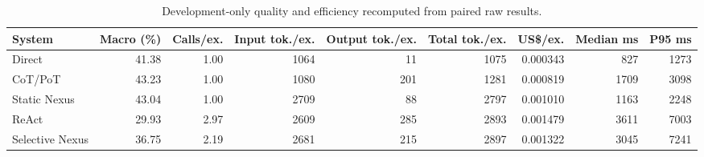 \begin{table}[t]
\centering
\small
\begin{tabular}{lrrrrrrrr}
\toprule
System & Macro (\%) & Calls/ex. & Input tok./ex. & Output tok./ex. & Total tok./ex. & US\$/ex. & Median ms & P95 ms \\
\midrule
Direct & 41.38 & 1.00 & 1064 & 11 & 1075 & 0.000343 & 827 & 1273 \\
CoT/PoT & 43.23 & 1.00 & 1080 & 201 & 1281 & 0.000819 & 1709 & 3098 \\
Static Nexus & 43.04 & 1.00 & 2709 & 88 & 2797 & 0.001010 & 1163 & 2248 \\
ReAct & 29.93 & 2.97 & 2609 & 285 & 2893 & 0.001479 & 3611 & 7003 \\
Selective Nexus & 36.75 & 2.19 & 2681 & 215 & 2897 & 0.001322 & 3045 & 7241 \\
\bottomrule
\end{tabular}
\caption{Development-only quality and efficiency recomputed from paired raw results.}
\label{tab:realm-paired-statistics}
\end{table}
